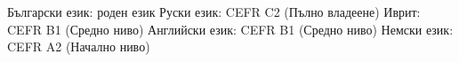 \cventrytwo
{
Български език: роден език
\newline
Руски език: \space \space \space \space \space \space \space \space \space CEFR C2 (Пълно владеене)
\newline
Иврит:  \space \space \space \space \space \space \space \space \space \space  \space \space \space \space \space \space \space CEFR B1 (Средно ниво)
\newline
Английски език: CEFR B1 (Средно ниво)
\newline
Немски език: \space \space \space \space \space \space CEFR A2 (Начално ниво)
}